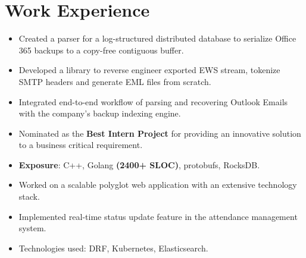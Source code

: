 \documentclass[10pt, margin=0.5in]{deedy-resume-openfont}
\begin{document}
\hfill
\begin{minipage}[t]{0.48\textwidth}

\vspace{-8pt}
\section{Work Experience}

\begin{itemize}[leftmargin=*, noitemsep]
  \item Created a parser for a log-structured distributed database to serialize
	Office 365 backups to a copy-free contiguous buffer.
  \item Developed a library to reverse engineer exported EWS stream, tokenize SMTP
	headers and generate EML files from scratch.
  \item Integrated end-to-end workflow of parsing and recovering Outlook Emails
	with the company's backup indexing engine.
  \item Nominated as the \textbf{Best Intern Project} for providing an innovative
	solution to a business critical requirement.
  \item \textbf{Exposure}: C++, Golang \textbf{(2400+ SLOC)}, protobufs, RocksDB.

\end{itemize}

\vspace{5pt}
\begin{itemize}[leftmargin=*, noitemsep]
  \item Worked on a scalable polyglot web application with an extensive technology stack.
  \item Implemented real-time status update feature in the attendance management system.
  \item Technologies used: DRF, Kubernetes, Elasticsearch.
\end{itemize}


\end{minipage}
\end{document}
